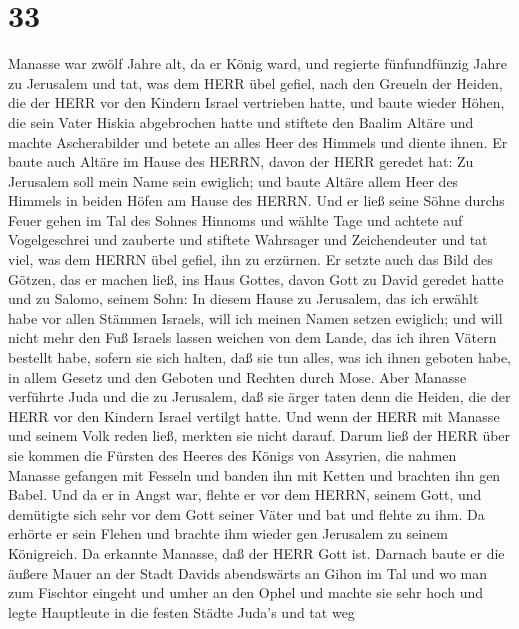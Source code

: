 \hypertarget{section-32}{%
\section{33}\label{section-32}}

 Manasse war zwölf Jahre alt, da er König ward, und regierte
fünfundfünzig Jahre zu Jerusalem  und tat, was dem HERR übel
gefiel, nach den Greueln der Heiden, die der HERR vor den Kindern Israel
vertrieben hatte,  und baute wieder Höhen, die sein Vater
Hiskia abgebrochen hatte und stiftete den Baalim Altäre und machte
Ascherabilder und betete an alles Heer des Himmels und diente ihnen.
 Er baute auch Altäre im Hause des HERRN, davon der HERR
geredet hat: Zu Jerusalem soll mein Name sein ewiglich;  und
baute Altäre allem Heer des Himmels in beiden Höfen am Hause des HERRN.
 Und er ließ seine Söhne durchs Feuer gehen im Tal des
Sohnes Hinnoms und wählte Tage und achtete auf Vogelgeschrei und
zauberte und stiftete Wahrsager und Zeichendeuter und tat viel, was dem
HERRN übel gefiel, ihn zu erzürnen.  Er setzte auch das Bild
des Götzen, das er machen ließ, ins Haus Gottes, davon Gott zu David
geredet hatte und zu Salomo, seinem Sohn: In diesem Hause zu Jerusalem,
das ich erwählt habe vor allen Stämmen Israels, will ich meinen Namen
setzen ewiglich;  und will nicht mehr den Fuß Israels lassen
weichen von dem Lande, das ich ihren Vätern bestellt habe, sofern sie
sich halten, daß sie tun alles, was ich ihnen geboten habe, in allem
Gesetz und den Geboten und Rechten durch Mose.  Aber Manasse
verführte Juda und die zu Jerusalem, daß sie ärger taten denn die
Heiden, die der HERR vor den Kindern Israel vertilgt hatte.
 Und wenn der HERR mit Manasse und seinem Volk reden ließ,
merkten sie nicht darauf.  Darum ließ der HERR über sie
kommen die Fürsten des Heeres des Königs von Assyrien, die nahmen
Manasse gefangen mit Fesseln und banden ihn mit Ketten und brachten ihn
gen Babel.  Und da er in Angst war, flehte er vor dem
HERRN, seinem Gott, und demütigte sich sehr vor dem Gott seiner Väter
 und bat und flehte zu ihm. Da erhörte er sein Flehen und
brachte ihm wieder gen Jerusalem zu seinem Königreich. Da erkannte
Manasse, daß der HERR Gott ist.  Darnach baute er die
äußere Mauer an der Stadt Davids abendswärts an Gihon im Tal und wo man
zum Fischtor eingeht und umher an den Ophel und machte sie sehr hoch und
legte Hauptleute in die festen Städte Juda's  und tat weg
